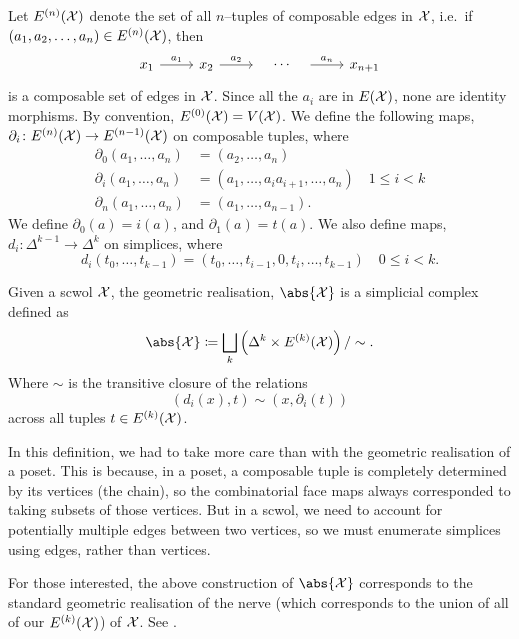 Let $E^{(n)}(\mathcal{X})$ denote the set of all $n$--tuples of composable edges in $\mathcal{X}$,
i.e.~if $(a_1, a_2, \ldots, a_n) \in E^{(n)}(\mathcal{X})$, then
\[
	\begin{tikzcd}
		x_1 \ar[r, "a_1"] & x_2 \ar[r, "a_2"] & {} \ar[r, phantom, "\cdots"] & {} \ar[r, "a_n"] & x_{n+1}
	\end{tikzcd}
\]
is a composable set of edges in $\mathcal{X}$.
Since all the $a_i$ are in $E(\mathcal{X})$, none are identity morphisms.
By convention, $E^{(0)}(\mathcal{X}) = V(\mathcal{X})$.
We define the following maps, $\partial_i \colon E^{(n)}(\mathcal{X}) \to E^{(n-1)}(\mathcal{X})$ on composable tuples, where
\begin{align*}
	\partial_0(a_1,\ldots,a_n) & = (a_2,\ldots,a_n)                                          \\
	\partial_i(a_1,\ldots,a_n) & = (a_1, \ldots, a_ia_{i+1}, \ldots, a_n) \quad 1 \leq i < k \\
	\partial_n(a_1,\ldots,a_n) & = (a_1, \ldots, a_{n-1})
	.\end{align*}
We define $\partial_0(a)=i(a)$, and $\partial_1(a)=t(a)$.
We also define maps, $d_i \colon \Delta^{k-1} \to \Delta^k$ on simplices, where
\[
	d_i(t_0, \ldots, t_{k-1}) = (t_0, \ldots, t_{i-1}, 0, t_i, \ldots, t_{k-1}) \quad 0 \leq i < k
	.\]

\begin{definition}
	Given a scwol $\mathcal{X}$, the geometric realisation, $\abs{\calx}$ is a simplicial complex defined as
	\[
		\abs{\calx} \coloneq \bigsqcup_k \left( \Delta^k \times E^{(k)}(\calx) \right) / \sim
		.\]
	Where $\sim$ is the transitive closure of the relations
	\[
		(d_i(x),t) \sim (x, \partial_i(t))
	\]
	across all tuples $t \in E^{(k)}(\mathcal{X})$.
	\label{def:geometric_realisation_of_scwol}
\end{definition}
In this definition, we had to take more care than with the geometric realisation of a poset.
This is because, in a poset, a composable tuple is completely determined by its vertices (the chain), so the combinatorial face maps always corresponded to taking subsets of those vertices.
But in a scwol, we need to account for potentially multiple edges between two vertices, so we must enumerate simplices using edges, rather than vertices.

For those interested, the above construction of $\abs{\calx}$ corresponds to the standard geometric realisation of the nerve (which corresponds to the union of all of our $E^{(k)}(\mathcal{X})$) of $\mathcal{X}$.
See \cite{goerss_simplicial_2009}.

